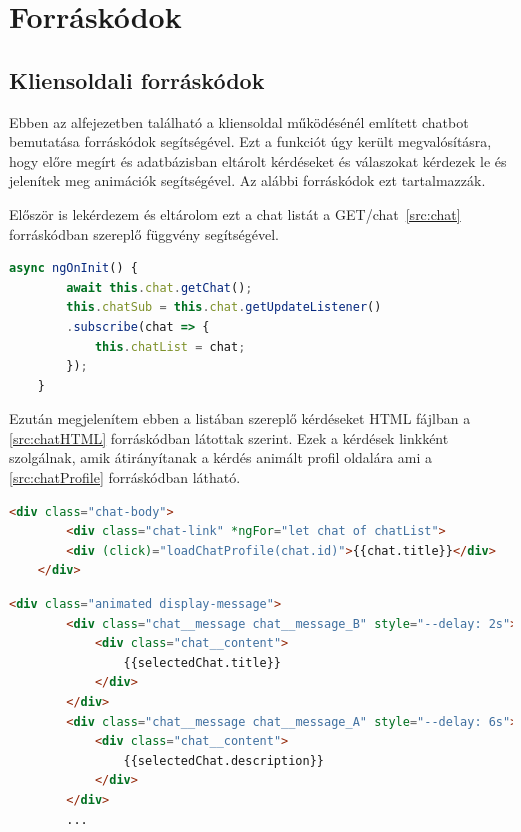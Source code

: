 


\section{Forráskódok} %

\subsection{Kliensoldali forráskódok}
Ebben az alfejezetben található a kliensoldal működésénél említett chatbot bemutatása forráskódok segítségével. Ezt a funkciót úgy került megvalósításra, hogy előre megírt és adatbázisban eltárolt kérdéseket és válaszokat kérdezek le és jelenítek meg animációk segítségével. Az alábbi forráskódok ezt tartalmazzák.

Először is lekérdezem és eltárolom ezt a chat listát a GET/chat~\ref{src:chat} forráskódban szereplő függvény  segítségével.

\begin{lstlisting}[language=JavaScript]
	async ngOnInit() {
		await this.chat.getChat();
		this.chatSub = this.chat.getUpdateListener()
		.subscribe(chat => {
			this.chatList = chat;
		});
	}
\end{lstlisting}

Ezután megjelenítem ebben a listában szereplő kérdéseket HTML fájlban a \ref{src:chatHTML} forráskódban látottak szerint. Ezek a kérdések linkként szolgálnak, amik átirányítanak a kérdés animált profil oldalára ami a \ref{src:chatProfile} forráskódban látható.
\begin{lstlisting}[language=html]
	 <div class="chat-body">
		<div class="chat-link" *ngFor="let chat of chatList">
		<div (click)="loadChatProfile(chat.id)">{{chat.title}}</div>
	</div>
\end{lstlisting}

\begin{lstlisting}[language=html]
	<div class="animated display-message">
		<div class="chat__message chat__message_B" style="--delay: 2s">
			<div class="chat__content">
				{{selectedChat.title}}
			</div>
		</div>
		<div class="chat__message chat__message_A" style="--delay: 6s">
			<div class="chat__content">
				{{selectedChat.description}}
			</div>
		</div>
		...
\end{lstlisting}

